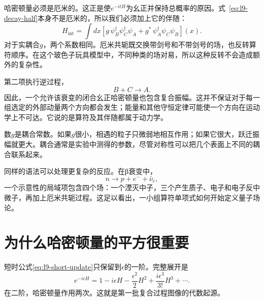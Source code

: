 哈密顿量必须是厄米的。这正是使\(e^{-itH}\)为幺正并保持总概率的原因。式~\eqref{eq:l9-decay-half}本身不是厄米的，所以我们必须加上它的伴随：
\begin{equation}
H_{\mathrm{int}}
=\int dx\left[
g\,\psi_B^\dagger\psi_C^\dagger\psi_A
+g^*\,\psi_A^\dagger\psi_C\psi_B
\right](x).
\label{eq:l9-hermitian-vertex}
\end{equation}
对于实耦合\(g\)，两个系数相同。厄米共轭既交换带剑号和不带剑号的场，也反转算符顺序。在这个玻色子玩具模型中，不同种类的场对易，所以这种反转不会造成额外的复杂性。

第二项执行逆过程，
\begin{equation}
B+C\longrightarrow A.
\end{equation}
因此，一个允许该衰变的闭合幺正哈密顿量也包含复合振幅。这并不保证对于每一组选定的外部动量两个方向都会发生；能量和其他守恒定律可能使一个方向在运动学上不可达。它说的是算符及其伴随都属于动力学。

\begin{classroomqa}
\end{classroomqa}

数\(g\)是耦合常数。如果\(g\)很小，相遇的粒子只微弱地相互作用；如果它很大，跃迁振幅就更大。耦合通常是实验中测得的参数，尽管对称性可以把几个表面上不同的耦合联系起来。

同样的语法可以处理更复杂的反应。在{\proseunicodefont β}衰变中，
\begin{equation}
n\longrightarrow p+e^-+\bar\nu_e,
\end{equation}
一个示意性的局域项包含四个场：一个湮灭中子，三个产生质子、电子和电子反中微子，再加上厄米共轭过程。这足以看出，一小组算符单项式如何开始定义量子场论。

\section{为什么哈密顿量的平方很重要}

短时公式\eqref{eq:l9-short-update}只保留到\(\epsilon\)的一阶。完整展开是
\begin{equation}
e^{-i\epsilon H}
=1-i\epsilon H-\frac{\epsilon^2}{2}H^2
+\frac{i\epsilon^3}{3!}H^3+\cdots.
\label{eq:l9-exponential}
\end{equation}
在二阶，哈密顿量作用两次。这就是第一批复合过程图像的代数起源。

